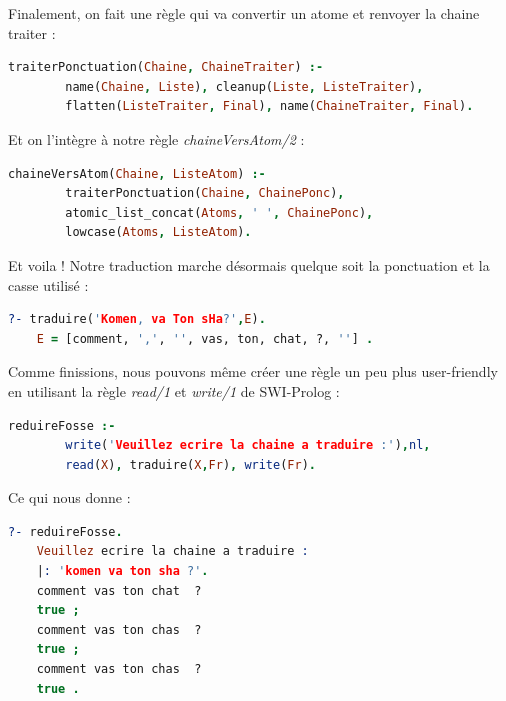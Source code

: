 \documentclass[11pt]{book}
\begin{document}
	Finalement, on fait une règle qui va convertir un atome et renvoyer la chaine traiter :
	\begin{lstlisting}[language=Prolog]
	traiterPonctuation(Chaine, ChaineTraiter) :-
		name(Chaine, Liste), cleanup(Liste, ListeTraiter),
		flatten(ListeTraiter, Final), name(ChaineTraiter, Final).
	\end{lstlisting}
	
	Et on l'intègre à notre règle {\em chaineVersAtom/2} :
	\begin{lstlisting}[language=Prolog]
	chaineVersAtom(Chaine, ListeAtom) :-
		traiterPonctuation(Chaine, ChainePonc),
		atomic_list_concat(Atoms, ' ', ChainePonc),
		lowcase(Atoms, ListeAtom).
	\end{lstlisting}
	
	Et voila ! Notre traduction marche désormais quelque soit la ponctuation et la casse utilisé :
	\begin{lstlisting}[language=Prolog]
	?- traduire('Komen, va Ton sHa?',E).
	E = [comment, ',', '', vas, ton, chat, ?, ''] .
	\end{lstlisting}
	
	Comme finissions, nous pouvons même créer une règle un peu plus user-friendly en utilisant la règle {\em read/1} et {\em write/1} de SWI-Prolog :
	\begin{lstlisting}[language=Prolog]
	reduireFosse :-
		write('Veuillez ecrire la chaine a traduire :'),nl,
		read(X), traduire(X,Fr), write(Fr).
	\end{lstlisting}
	
	Ce qui nous donne :
	\begin{lstlisting}[language=Prolog]
	?- reduireFosse.
	Veuillez ecrire la chaine a traduire :
	|: 'komen va ton sha ?'.
	comment vas ton chat  ?  
	true ;
	comment vas ton chas  ?  
	true ;
	comment vas ton chas  ?  
	true .
	\end{lstlisting}
	
\end{document}
